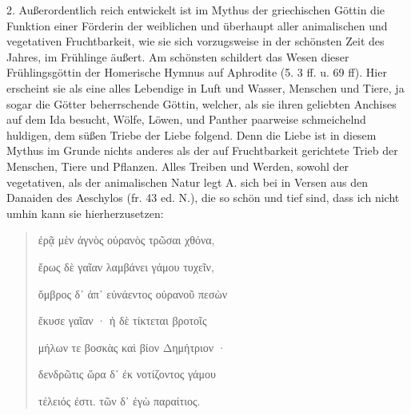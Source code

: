 \documentclass[a4paper, 11pt, oneside]{article}
\begin{document}
2. Außerordentlich reich entwickelt ist im Mythus der griechischen Göttin die Funktion einer Förderin der weiblichen und überhaupt aller animalischen und vegetativen Fruchtbarkeit, wie sie sich vorzugsweise in der schönsten Zeit des Jahres, im Frühlinge äußert. Am schönsten schildert das Wesen dieser Frühlingsgöttin der Homerische Hymnus auf Aphrodite (5. 3 ff. u. 69 ff). Hier erscheint sie als eine alles Lebendige in Luft und Wasser, Menschen und Tiere, ja sogar die Götter beherrschende Göttin, welcher, als sie ihren geliebten Anchises auf dem Ida besucht, Wölfe, Löwen, und Panther paarweise schmeichelnd huldigen, dem süßen Triebe der Liebe folgend. Denn die Liebe ist in diesem Mythus im Grunde nichts anderes als der auf Fruchtbarkeit gerichtete Trieb der Menschen, Tiere und Pflanzen. Alles Treiben und Werden, sowohl der vegetativen, als der animalischen Natur legt A. sich bei in Versen aus den Danaiden des Aeschylos (fr. 43 ed. N.), die so schön und tief sind, dass ich nicht umhin kann sie hierherzusetzen:
\begin{quotation}
ἐρᾷ μὲν ἁγνὸς οὐρανὸς τρῶσαι χθόνα,

ἔρως δὲ γαῖαν λαμβάνει γάμου τυχεῖν,

ὄμβρος δ᾽ ἀπ᾽ εὐνάεντος οὐρανοῦ πεσὼν

ἔκυσε γαῖαν · ἡ δὲ τίκτεται βροτοῖς

μήλων τε βοσκὰς καὶ βίον Δημήτριον ·

δενδρῶτις ὥρα δ᾽ ἐκ νοτίζοντος γάμου

τέλειός ἐστι. τῶν δ᾽ ἐγὼ παραίτιος.
\end{quotation}
\end{document}
